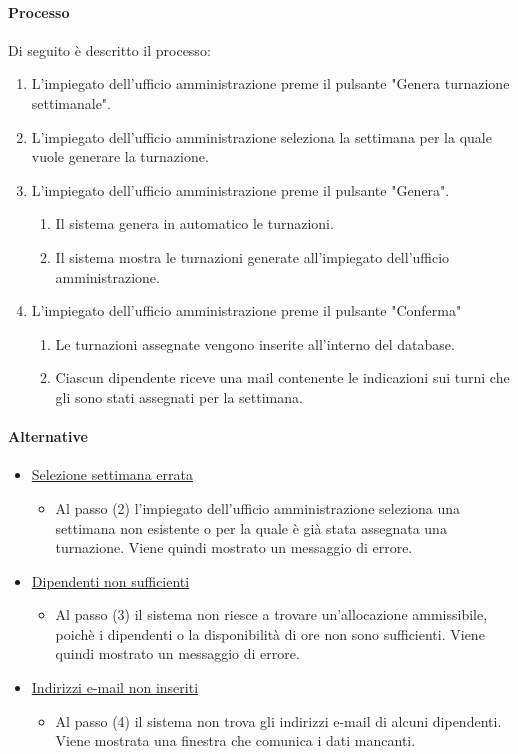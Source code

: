 \paragraph{Processo}
Di seguito è descritto il processo:
\begin{enumerate}
	\item L'impiegato dell'ufficio amministrazione preme il pulsante "Genera turnazione settimanale".
	\item L'impiegato dell'ufficio amministrazione seleziona la settimana per la quale vuole generare la turnazione.
	\item L'impiegato dell'ufficio amministrazione preme il pulsante "Genera".
		\begin{enumerate}
			\item Il sistema genera in automatico le turnazioni.
			\item Il sistema mostra le turnazioni generate all'impiegato dell'ufficio amministrazione.
		\end{enumerate}
	\item L'impiegato dell'ufficio amministrazione preme il pulsante "Conferma"
		\begin{enumerate}
			\item Le turnazioni assegnate vengono inserite all'interno del database.
			\item Ciascun dipendente riceve una mail contenente le indicazioni sui turni che gli sono stati assegnati per la settimana.
		\end{enumerate}
\end{enumerate}
\paragraph{Alternative}
\begin{itemize}
	\item \underline{Selezione settimana errata}
		\begin{itemize}
			\item Al passo (2) l'impiegato dell'ufficio amministrazione seleziona una settimana non esistente o per la quale è già stata assegnata una turnazione. Viene quindi mostrato un messaggio di errore.
		\end{itemize}
	\item \underline{Dipendenti non sufficienti}
		\begin{itemize}
			\item Al passo (3) il sistema non riesce a trovare un'allocazione ammissibile, poichè i dipendenti o la disponibilità di ore non sono sufficienti. Viene quindi mostrato un messaggio di errore.
		\end{itemize}
	\item \underline{Indirizzi e-mail non inseriti}
		\begin{itemize}
			\item Al passo (4) il sistema non trova gli indirizzi e-mail di alcuni dipendenti. Viene mostrata una finestra che comunica i dati mancanti.
		\end{itemize}
\end{itemize}
